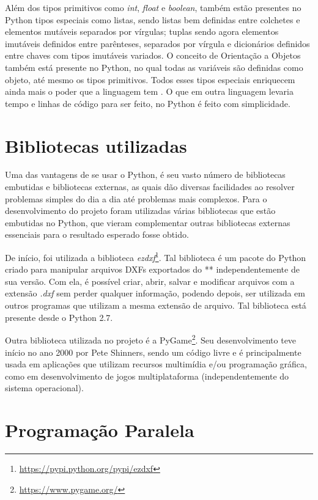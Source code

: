 \documentclass[
	12pt,				%
	twoside,			%
	a4paper,			%
	english,			%
	french,				%
	spanish,			%
	brazil				%
	]{abntex2}
\begin{document}
Além dos tipos primitivos como \emph{int}, \emph{float} e
\emph{boolean}, também estão presentes no Python tipos especiais como
listas, sendo listas bem definidas entre colchetes e elementos mutáveis
separados por vírgulas; tuplas sendo agora elementos imutáveis definidos
entre parênteses, separados por vírgula e dicionários definidos entre
chaves com tipos imutáveis variados. O conceito de Orientação a Objetos
também está presente no Python, no qual todas as variáveis são definidas
como objeto, até mesmo os tipos primitivos. Todos esses tipos especiais
enriquecem ainda mais o poder que a linguagem tem \cite{GUIDO}. O que em
outra linguagem levaria tempo e linhas de código para ser feito, no
Python é feito com simplicidade.

\section{Bibliotecas utilizadas}\label{bibliotecas-utilizadas}

Uma das vantagens de se usar o Python, é seu vasto número de bibliotecas
embutidas e bibliotecas externas, as quais dão diversas facilidades ao
resolver problemas simples do dia a dia até problemas mais complexos.
Para o desenvolvimento do projeto foram utilizadas várias bibliotecas
que estão embutidas no Python, que vieram complementar outras
bibliotecas externas essenciais para o resultado esperado fosse obtido.

De início, foi utilizada a biblioteca \emph{ezdxf}\footnote{\url{https://pypi.python.org/pypi/ezdxf}}.
Tal biblioteca é um pacote do Python criado para manipular arquivos DXFs
exportados do ** independentemente de sua versão. Com ela, é possível
criar, abrir, salvar e modificar arquivos com a extensão \emph{.dxf} sem
perder qualquer informação, podendo depois, ser utilizada em outros
programas que utilizam a mesma extensão de arquivo. Tal biblioteca está
presente desde o Python 2.7.

Outra biblioteca utilizada no projeto é a PyGame\footnote{\url{https://www.pygame.org/}}.
Seu desenvolvimento teve início no ano 2000 por Pete Shinners, sendo um
código livre e é principalmente usada em aplicações que utilizam
recursos multimídia e/ou programação gráfica, como em desenvolvimento de
jogos multiplataforma (independentemente do sistema operacional).

\section{Programação Paralela}\label{programauxe7uxe3o-paralela}
\end{document}
